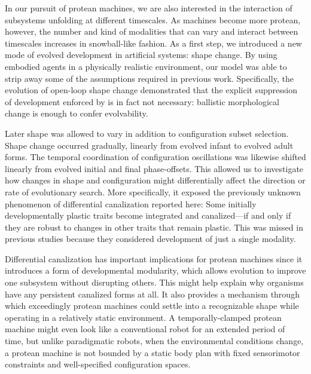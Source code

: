 In our pursuit of 
protean machines,
we are also interested in the interaction of subsystems unfolding at different timescales.
As machines become more protean, however, the  number and kind of modalities that can vary and interact between timescales increases in snowball-like fashion.
As a first step,
we introduced
a new mode of evolved development in artificial systems: shape change.
By using embodied agents in a physically realistic environment,
our model was able to strip away some of the assumptions required in previous work.
Specifically,
the evolution of open-loop shape change demonstrated that the explicit suppression of development enforced by \citet{hinton1987learning} 
is in fact not necessary: ballistic morphological change is enough to confer evolvability.


Later shape was allowed to vary in addition to configuration subset selection.
Shape change occurred gradually, linearly from evolved infant to evolved adult forms.
The temporal coordination of configuration oscillations was likewise shifted linearly from evolved initial and final phase-offsets.
This allowed us to investigate how changes in shape and configuration might differentially affect the direction or rate of evolutionary search.
More specifically, it exposed the previously unknown phenomenon of differential canalization reported here:
Some initially developmentally plastic traits become integrated and canalized---if and only if they are robust to changes in other traits that remain plastic.
This was missed in previous studies because they considered development of just a single modality.

Differential canalization has important implications for protean machines since it introduces a form of developmental modularity,
which
allows evolution to improve one subsystem without disrupting others.
This might help explain why organisms have any persistent canalized forms at all.
It also provides a mechanism through which exceedingly protean machines could settle into a recognizable shape while operating in a relatively static environment.
A temporally-clamped protean machine might even look like a conventional robot for an extended period of time, but unlike paradigmatic robots, when the environmental conditions change, a protean machine is not bounded by a static body plan with fixed sensorimotor constraints and well-specified configuration spaces.

